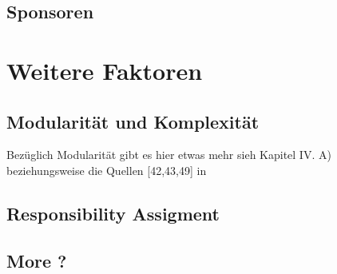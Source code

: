 




\subsection{Sponsoren}



\section{Weitere Faktoren} \label{sec:Weitere Faktoren}




\subsection{Modularität und Komplexität}

Bezüglich Modularität gibt es hier etwas mehr \cite{marganSuccessOpenSource2015} sieh Kapitel IV. A)
beziehungsweise die Quellen [42,43,49] in \cite{marganSuccessOpenSource2015}

\subsection{Responsibility Assigment}
\subsection{More ?}


